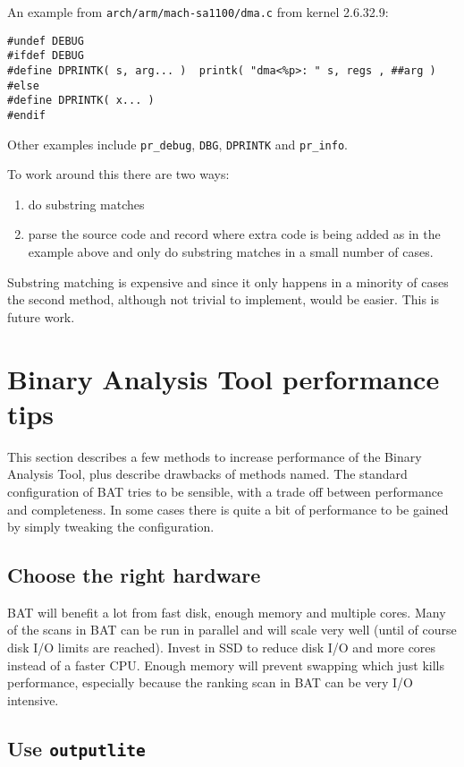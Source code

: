 \documentclass[10pt,a4paper]{article}
\begin{document}
An example from \texttt{arch/arm/mach-sa1100/dma.c} from kernel 2.6.32.9:

\begin{verbatim}
#undef DEBUG
#ifdef DEBUG
#define DPRINTK( s, arg... )  printk( "dma<%p>: " s, regs , ##arg )
#else
#define DPRINTK( x... )
#endif
\end{verbatim}

Other examples include \texttt{pr\_debug}, \texttt{DBG}, \texttt{DPRINTK} and
\texttt{pr\_info}.

To work around this there are two ways:

\begin{enumerate}
\item do substring matches
\item parse the source code and record where extra code is being added as in
the example above and only do substring matches in a small number of cases.
\end{enumerate}

Substring matching is expensive and since it only happens in a minority of
cases the second method, although not trivial to implement, would be easier.
This is future work.

\section{Binary Analysis Tool performance tips}

This section describes a few methods to increase performance of the Binary
Analysis Tool, plus describe drawbacks of methods named. The standard
configuration of BAT tries to be sensible, with a trade off between performance
and completeness. In some cases there is quite a bit of performance to be
gained by simply tweaking the configuration.

\subsection{Choose the right hardware}

BAT will benefit a lot from fast disk, enough memory and multiple cores. Many
of the scans in BAT can be run in parallel and will scale very well (until
of course disk I/O limits are reached). Invest in SSD to reduce disk I/O and
more cores instead of a faster CPU. Enough memory will prevent swapping which
just kills performance, especially because the ranking scan in BAT can be very
I/O intensive.

\subsection{Use \texttt{outputlite}}
\end{document}
